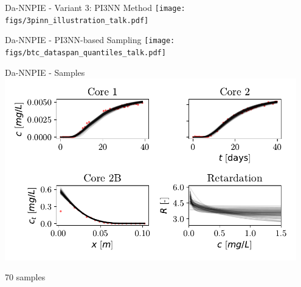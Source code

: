 \documentclass[aspectratio=1610]{beamer}
\begin{document}
\begin{frame}{Da-NNPIE - Variant 3: PI3NN Method}
\centering
\texttt{[image: figs/3pinn\_illustration\_talk.pdf]}
\end{frame}

\begin{frame}{Da-NNPIE - PI3NN-based Sampling}
\centering
\texttt{[image: figs/btc\_dataspan\_quantiles\_talk.pdf]}
\end{frame}

\begin{frame}{Da-NNPIE - Samples}
\centering
\includegraphics[width=0.95\textwidth]{figs/finn_dataspan_samples.pdf}

70 samples
\end{frame}
\end{document}
